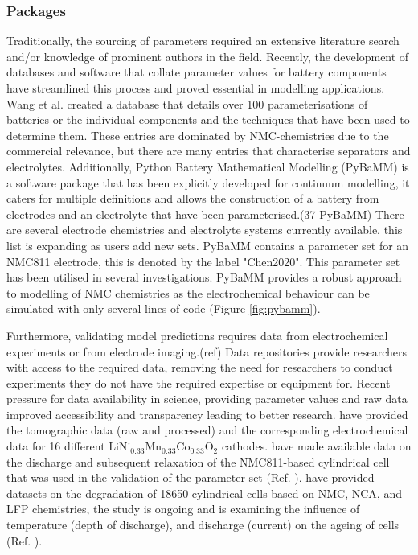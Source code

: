 \documentclass[aps,prb,twocolumn,superscriptaddress,reprint]{revtex4-1}
\begin{document}
\subsubsection{Packages}
Traditionally, the sourcing of parameters required an extensive literature search and/or knowledge of prominent authors in the field. Recently, the development of databases and software that collate parameter values for battery components have streamlined this process and proved essential in modelling applications.\cite{Tranter2020}  Wang et al. created a database that details over 100 parameterisations of batteries or the individual components and the techniques that have been used to determine them. These entries are dominated by NMC-chemistries due to the commercial relevance, but there are many entries that characterise separators and electrolytes. Additionally, Python Battery Mathematical Modelling (PyBaMM) is a software package that has been explicitly developed for continuum modelling, it caters for multiple definitions and allows the construction of a battery from electrodes and an electrolyte that have been parameterised.(37-PyBaMM) There are several electrode chemistries and electrolyte systems currently available, this list is expanding as users add new sets. PyBaMM contains a parameter set for an NMC811 electrode, this is denoted by the label "Chen2020".\cite{Chen2020} This parameter set has been utilised in several investigations.\cite{Tranter2020} PyBaMM provides a robust approach to modelling of NMC chemistries as the electrochemical behaviour can be simulated with only several lines of code (Figure \ref{fig:pybamm}).

Furthermore, validating model predictions requires data from electrochemical experiments or from electrode imaging.(ref) Data repositories provide researchers with access to the required data, removing the need for researchers to conduct experiments they do not have the required expertise or equipment for. Recent pressure for data availability in science, providing parameter values and raw data improved accessibility and transparency leading to better research. \citeauthor{Ebner_Geldmacher_Marone_Stampanoni_Wood_2013} have provided the tomographic data (raw and processed) and the corresponding electrochemical data for 16 different LiNi$_{0.33}$Mn$_{0.33}$Co$_{0.33}$O$_{2}$ cathodes. \cite{Ebner_Geldmacher_Marone_Stampanoni_Wood_2013} \citeauthor{Chen2020} have made available data on the discharge and subsequent relaxation of the NMC811-based cylindrical cell that was used in the validation of the parameter set  (Ref. ). \cite{Chen2020} \citeauthor{Devie_2018} have provided datasets on the degradation of 18650 cylindrical cells based on NMC, NCA, and LFP chemistries, the study is ongoing and is examining the influence of temperature (depth of discharge), and discharge (current) on the ageing of cells (Ref. ). \cite{Devie_2018} 
\end{document}
